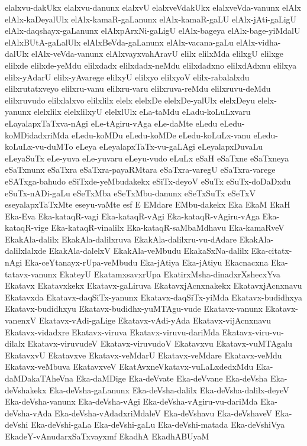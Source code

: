 {elalxvu-dakUkx
elalxvu-danunx
elalxvU
elalxveVdakUkx
elalxveVda-vanunx
elAlx
elAlx-kaDeyalUlx
elAlx-kamaR-gaLanunx
elAlx-kamaR-gaLU
elAlx-jAti-gaLigU
elAlx-daqshayx-gaLanunx
elAlxpArxNi-gaLigU
elAlx-bageya
elAlx-bage-yiMdalU
elAlxBUtA-gaLalUlx
elAlxBeVda-gaLanunx
elAlx-vacana-gaLu
elAlx-vidha-dalUlx
elAlx-veVda-vanunx
elAlxvayxvahAravU
elilx
elilxMda
elilxgU
elilxge
elilxde
elilxde-yeMdu
elilxdadx
elilxdadx-neMdu
elilxdadxno
elilxdAdxnu
elilxya
elilx-yAdarU
elilx-yAvarege
elilxyU
elilxyo
elilxyoV
elilx-rabalalxdu
elilxrutatxveyo
elilxru-vanu
elilxru-varu
elilxruva-reMdu
elilxruvu-deMdu
elilxruvudo
elilxlalxvo
elilxlilx
elelx
elelxDe
elelxDe-yalUlx
elelxDeyu
elelx-yanunx
elelxlilx
elelxlilxyU
elelxlUlx
eLa-taMdu
eLadu-koLuLxvaru
eLayalapxTaTxva-nAgi
eLe-tAgiru-vAga
eLe-daMte
eLedu
eLedu-koMDidadxriMda
eLedu-koMDu
eLedu-koMDe
eLedu-koLuLx-vanu
eLedu-koLuLx-vu-duMTo
eLeya
eLeyalapxTaTx-vu-gaLAgi
eLeyalapxDuvaLu
eLeyaSuTx
eLe-yuva
eLe-yuvaru
eLeyu-vudo
eLuLx
eSaH
eSaTxne
eSaTxneya
eSaTxnunx
eSaTxra
eSaTxra-payaRMtara
eSaTxra-varegU
eSaTxra-varege
eSATxga-bahudo
eSiTxde-yeMbudakekx
eSiTx-deyoV
eSuTx
eSuTx-doDaDxdu
eSuTx-nADi-gaLu
eSeTxMba
eSeTxMbu-danunx
eSeTxSuTx
eSeTxV
eseyalapxTaTxMte
eseyu-vaMte
esf
E
EMdare
EMbu-dakekx
Eka
EkaM
EkaH
Eka-Eva
Eka-kataqR-vagi
Eka-kataqR-vAgi
Eka-kataqR-vAgiru-vAga
Eka-kataqR-vige
Eka-kataqR-vinalilx
Eka-kataqR-saMbaMdhavu
Eka-kamaRveV
EkakAla-dalilx
EkakAla-dalilxruva
EkakAla-dalilxru-vu-dAdare
EkakAla-dalilxlalxde
EkakAla-dalelxV
EkakAla-veMbudu
EkakaSxNa-dalilx
Eka-citatx-nAgi
Eka-ceYtanayx-rUpa-veMbudu
Eka-jAtiya
Eka-jAtiyu
Ekacnacxna
Eka-tatavx-vanunx
EkateyU
EkatamxsavxrUpa
EkatirxMsha-dinadxrXshecxYva
Ekatavx
Ekatavxkekx
Ekatavx-gaLiruva
EkatavxjAcnxnakekx
EkatavxjAcnxnavu
Ekatavxda
Ekatavx-daqSiTx-yanunx
Ekatavx-daqSiTx-yiMda
Ekatavx-budidhxya
Ekatavx-budidhxyu
Ekatavx-budidhx-yuMTAgu-vude
Ekatavx-vanunx
Ekatavx-vanenxV
Ekatavx-vAdi-gaLige
Ekatavx-vAdi-yAda
Ekatavx-vijAcnxnavu
Ekatavx-vidadxre
Ekatavx-viruva
Ekatavx-viruvu-dariMda
Ekatavx-viru-vu-dilalx
Ekatavx-viruvudeV
Ekatavx-viruvudoV
Ekatavxvu
Ekatavx-vuMTAgalu
EkatavxvU
Ekatavxve
Ekatavx-veMdarU
Ekatavx-veMdare
Ekatavx-veMdu
Ekatavx-veMbuva
EkatavxveV
EkatAvxneVkatavx-vuLaLxdedxMdu
Eka-daMDakaTAheVna
Eka-daMDige
Eka-deVvate
Eka-deVvane
Eka-deVsha
Eka-deVshakekx
Eka-deVsha-gaLanunx
Eka-deVsha-dalilx
Eka-deVsha-dalilx-deyeV
Eka-deVsha-vanunx
Eka-deVsha-vAgi
Eka-deVsha-vAgiru-vu-dariMda
Eka-deVsha-vAda
Eka-deVsha-vAdadxriMdaleV
Eka-deVshavu
Eka-deVshaveV
Eka-deVshi
Eka-deVshi-gaLa
Eka-deVshi-gaLu
Eka-deVshi-matada
Eka-deVshiVya
EkadeY-vAnudarxSaTxvayxmf
EkadhA
EkadhABUyaM
}
